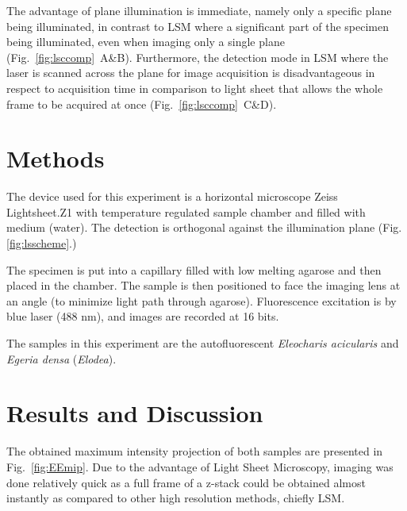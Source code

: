 The advantage of plane illumination is immediate, namely only a specific plane being illuminated, in contrast to LSM where a significant part of the specimen being illuminated, even when imaging only a single plane (Fig.~\ref{fig:lsccomp}~A\&B). 
Furthermore, the detection mode in LSM where the laser is scanned across the plane for image acquisition is disadvantageous in respect to acquisition time in comparison to light sheet that allows the whole frame to be acquired at once (Fig.~\ref{fig:lsccomp}~C\&D).


\section{Methods}

The device used for this experiment is a horizontal microscope Zeiss Lightsheet.Z1 with temperature regulated sample chamber and filled with medium (water). 
The detection is orthogonal against the illumination plane (Fig. \ref{fig:lsscheme}.) 

The specimen is put into a capillary filled with low melting agarose and then placed in the chamber. 
The sample is then positioned to face the imaging lens at an angle (to minimize light path through agarose). 
Fluorescence excitation is by blue laser (488 nm), and images are recorded at 16 bits.

The samples in this experiment are the autofluorescent \textit{Eleocharis acicularis} and \textit{Egeria densa} (\textit{Elodea}).

\section{Results and Discussion}

The obtained maximum intensity projection of both samples are presented in Fig.~\ref{fig:EEmip}. 
Due to the advantage of Light Sheet Microscopy, imaging was done relatively quick as a full frame of a z-stack could be obtained almost instantly as compared to other high resolution methods, chiefly LSM. 

